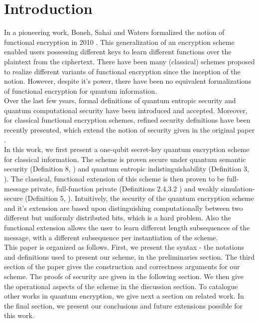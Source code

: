 \section{Introduction}

In a pioneering work, Boneh, Sahai and Waters formalized the notion of functional encryption in 2010 \cite{fe}. This generalization of an encryption scheme enabled users possessing different keys to learn different functions over the plaintext from the ciphertext. There have been many (classical) schemes proposed to realize different variants of functional encryption since the inception of the notion. However, despite it's power, there have been no equivalent formalizations of functional encryption for quantum information. \\
Over the last few years, formal definitions of quantum entropic security \cite{entsec} and quantum computational security \cite{compsec} have been introduced and accepted. Moreover, for classical functional encryption schemes, refined security definitions \cite{fesec} have been recently presented, which extend the notion of security given in the original paper \cite{fe}. \\
In this work, we first present a one-qubit secret-key quantum encryption scheme for classical information. The scheme is proven secure under quantum semantic security (Definition 8, \cite{compsec}) and quantum entropic indistinguishability (Definition 3, \cite{entsec}). The classical, functional extension of this scheme is then proven to be full-message private, full-function private (Definitions 2.4,3.2 \cite{fesec}) and weakly simulation-secure (Definition 5, \cite{fe}). Intuitively, the security of the quantum encryption scheme and it's extension are based upon distinguishing computationally between two different but uniformly distributed bits, which is a hard problem. Also the functional extension allows the user to learn different length subsequences of the message, with a different subsequence per instantiation of the scheme. \\
This paper is organized as follows. First, we present the syntax - the notations and definitions used to present our scheme, in the preliminaries section. The third section of the paper gives the construction and correctness arguments for our scheme. The proofs of security are given in the following section. We then give the operational aspects of the scheme in the discussion section. To catalogue other works in quantum encryption, we give next a section on related work. In the final section, we present our conclusions and future extensions possible for this work.